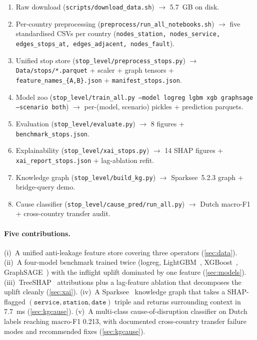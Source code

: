 \begin{enumerate}
    \item Raw download (\texttt{scripts/download\_data.sh}) $\to$ \SI{5.7}{GB} on disk.
    \item Per-country preprocessing (\texttt{preprocess/run\_all\_notebooks.sh}) $\to$ five standardised CSVs per country (\texttt{nodes\_station, nodes\_service, edges\_stops\_at, edges\_adjacent, nodes\_fault}).
    \item Unified stop store (\texttt{stop\_level/preprocess\_stops.py}) $\to$ \texttt{Data/stops/*.parquet} + scaler + graph tensors + \texttt{feature\_names\_\{A,B\}.json} + \texttt{manifest\_stops.json}.
    \item Model zoo (\texttt{stop\_level/train\_all.py --model logreg lgbm xgb graphsage --scenario both}) $\to$ per-(model, scenario) pickles + prediction parquets.
    \item Evaluation (\texttt{stop\_level/evaluate.py}) $\to$ 8 figures + \texttt{benchmark\_stops.json}.
    \item Explainability (\texttt{stop\_level/xai\_stops.py}) $\to$ 14 SHAP figures + \texttt{xai\_report\_stops.json} + lag-ablation refit.
    \item Knowledge graph (\texttt{stop\_level/build\_kg.py}) $\to$ Sparksee~5.2.3 graph + bridge-query demo.
    \item Cause classifier (\texttt{stop\_level/cause\_pred/run\_all.py}) $\to$ Dutch macro-F1 + cross-country transfer audit.
\end{enumerate}

\paragraph{Five contributions.} (i)~A unified anti-leakage feature store covering three operators (\cref{sec:data}). (ii)~A four-model benchmark trained twice (logreg, LightGBM~\cite{ke2017lightgbm}, XGBoost~\cite{chen2016xgboost}, GraphSAGE~\cite{hamilton2017inductive}) with the inflight uplift dominated by one feature (\cref{sec:models}). (iii)~TreeSHAP~\cite{lundberg2017unified,lundberg2020local} attributions plus a lag-feature ablation that decomposes the uplift cleanly (\cref{sec:xai}). (iv)~A Sparksee~\cite{sparksee2024} knowledge graph that takes a SHAP-flagged $(\texttt{service}, \texttt{station}, \texttt{date})$ triple and returns surrounding context in \SI{7.7}{ms} (\cref{sec:kgcause}). (v)~A multi-class cause-of-disruption classifier on Dutch labels reaching macro-F1 \num{0.213}, with documented cross-country transfer failure modes and recommended fixes (\cref{sec:kgcause}).
